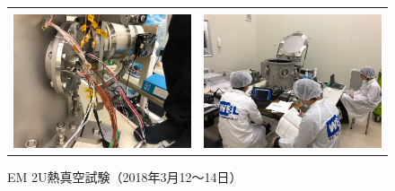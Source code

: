 \begin{figure}[H]
\begin{tabular}{cc}
\begin{minipage}{0.5\hsize}
\begin{center}
			\end{center}
		\end{minipage}\\
		\begin{minipage}{0.5\hsize}
			\begin{center}
				\includegraphics[width=1\textwidth]{04/fig/4-8-3-3.jpg}
			\end{center}
		\end{minipage}&
		\begin{minipage}{0.5\hsize}
			\begin{center}
				\includegraphics[width=1\textwidth]{04/fig/4-8-3-4.jpg}
			\end{center}
		\end{minipage}
	\end{tabular}
	\caption{EM 2U熱真空試験（2018年3月12～14日）}
	\label{fig4-8-3-1}
\end{figure}

